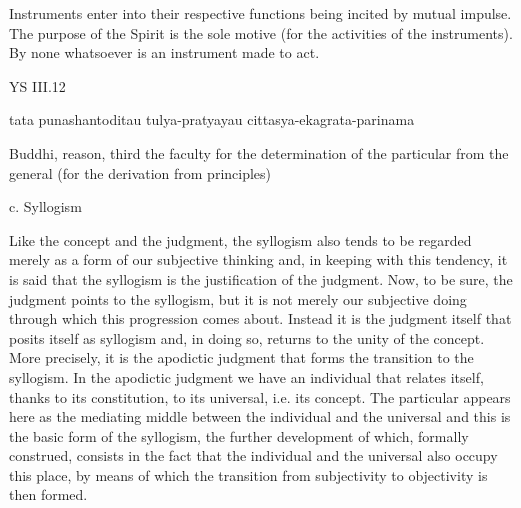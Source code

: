 Instruments enter into their respective functions being incited by mutual impulse.
The purpose of the Spirit is the sole motive (for the activities of the instruments).
By none whatsoever is an instrument made to act.

YS III.12

tata punashantoditau tulya-pratyayau cittasya-ekagrata-parinama

Buddhi, reason, third the faculty for the determination of the particular
from the general (for the derivation from principles)

c. Syllogism

Like the concept and the judgment, the syllogism also tends to be
regarded merely as a form of our subjective thinking and, in keeping with this
tendency, it is said that the syllogism is the justification of the
judgment. Now, to be sure, the judgment points to the syllogism, but it is not
merely our subjective doing through which this progression comes about. Instead
it is the judgment itself that posits itself as syllogism and, in doing so, returns to
the unity of the concept. More precisely, it is the apodictic judgment that forms
the transition to the syllogism. In the apodictic judgment we have an individual
that relates itself, thanks to its constitution, to its universal, i.e. its concept. The
particular appears here as the mediating middle between the individual and the
universal and this is the basic form of the syllogism, the further development of
which, formally construed, consists in the fact that the individual and the universal
also occupy this place, by means of which the transition from subjectivity to
objectivity is then formed.

